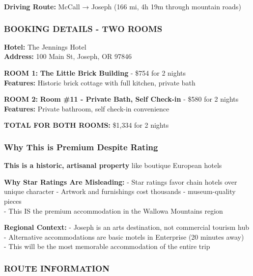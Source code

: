 \documentclass[
  11pt,
]{article}
\begin{document}
\textbf{\textcolor{secondary}{Driving Route:}} McCall → Joseph (166 mi,
4h 19m through mountain roads)

\subsubsection{\texorpdfstring{\textcolor{primary}{BOOKING DETAILS - TWO ROOMS}}{}}\label{section-26}

\textbf{\textcolor{secondary}{Hotel:}} The Jennings Hotel\\
\textbf{\textcolor{secondary}{Address:}} 100 Main St, Joseph, OR 97846

\textbf{\textcolor{primary}{ROOM 1:}} \textbf{The Little Brick Building}
- \$754 for 2 nights\\
\textbf{\textcolor{secondary}{Features:}} Historic brick cottage with
full kitchen, private bath

\textbf{\textcolor{primary}{ROOM 2:}} \textbf{Room \#11 - Private Bath,
Self Check-in} - \$580 for 2 nights\\
\textbf{\textcolor{secondary}{Features:}} Private bathroom, self
check-in convenience

\textbf{\textcolor{primary}{TOTAL FOR BOTH ROOMS:}} \$1,334 for 2 nights

\subsubsection{\texorpdfstring{\textcolor{primary}{Why This is Premium Despite Rating}}{}}\label{section-27}

\textbf{\textcolor{secondary}{This is a historic, artisanal property}}
like boutique European hotels

\textbf{\textcolor{primary}{Why Star Ratings Are Misleading:}} - Star
ratings favor chain hotels over unique character - Artwork and
furnishings cost thousands - museum-quality pieces\\
- This IS the premium accommodation in the Wallowa Mountains region

\textbf{\textcolor{primary}{Regional Context:}} - Joseph is an arts
destination, not commercial tourism hub - Alternative accommodations are
basic motels in Enterprise (20 minutes away)\\
- This will be the most memorable accommodation of the entire trip

\subsubsection{\texorpdfstring{\textcolor{primary}{ROUTE INFORMATION}}{}}\label{section-28}
\end{document}
